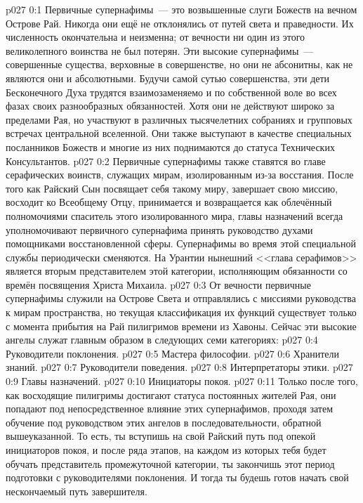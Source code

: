 \author{Совершенствователь Мудрости}
\vs p027 0:1 Первичные супернафимы~--- это возвышенные слуги Божеств на вечном Острове Рай. Никогда они ещё не отклонялись от путей света и праведности. Их численность окончательна и неизменна; от вечности ни один из этого великолепного воинства не был потерян. Эти высокие супернафимы~--- совершенные существа, верховные в совершенстве, но они не абсонитны, как не являются они и абсолютными. Будучи самой сутью совершенства, эти дети Бесконечного Духа трудятся взаимозаменяемо и по собственной воле во всех фазах своих разнообразных обязанностей. Хотя они не действуют широко за пределами Рая, но участвуют в различных тысячелетних собраниях и групповых встречах центральной вселенной. Они также выступают в качестве специальных посланников Божеств и многие из них поднимаются до статуса Технических Консультантов.
\vs p027 0:2 Первичные супернафимы также ставятся во главе серафических воинств, служащих мирам, изолированным из\hyp{}за восстания. После того как Райский Сын посвящает себя такому миру, завершает свою миссию, восходит ко Всеобщему Отцу, принимается и возвращается как облечённый полномочиями спаситель этого изолированного мира, главы назначений всегда уполномочивают первичного супернафима принять руководство духами помощниками восстановленной сферы. Супернафимы во время этой специальной службы периодически сменяются. На Урантии нынешний <<глава серафимов>> является вторым представителем этой категории, исполняющим обязанности со времён посвящения Христа Михаила.
\vs p027 0:3 От вечности первичные супернафимы служили на Острове Света и отправлялись с миссиями руководства к мирам пространства, но текущая классификация их функций существует только с момента прибытия на Рай пилигримов времени из Хавоны. Сейчас эти высокие ангелы служат главным образом в следующих семи категориях:
\vs p027 0:4 Руководители поклонения.
\vs p027 0:5 Мастера философии.
\vs p027 0:6 Хранители знаний.
\vs p027 0:7 Руководители поведения.
\vs p027 0:8 Интерпретаторы этики.
\vs p027 0:9 Главы назначений.
\vs p027 0:10 Инициаторы покоя.
\vs p027 0:11 Только после того, как восходящие пилигримы достигают статуса постоянных жителей Рая, они попадают под непосредственное влияние этих супернафимов, проходя затем обучение под руководством этих ангелов в последовательности, обратной вышеуказанной. То есть, ты вступишь на свой Райский путь под опекой инициаторов покоя, и после ряда этапов, на каждом из которых тебя будет обучать представитель промежуточной категории, ты закончишь этот период подготовки с руководителями поклонения. И тогда ты будешь готов начать свой нескончаемый путь завершителя.
